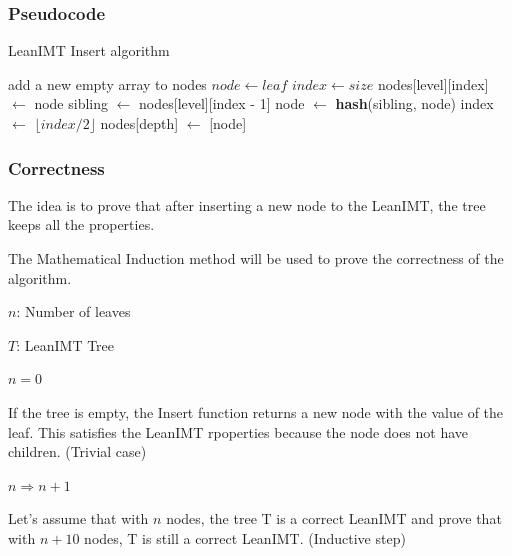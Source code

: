\documentclass{article}
\begin{document}
\subsubsection{Pseudocode}

\begin{algorithm}[H]
    \caption{LeanIMT Insert algorithm}\label{insert}
    \begin{algorithmic}[1]
         
        \State add a new empty array to nodes 
        \EndIf
        \State $node\gets leaf$
        \State $index\gets size$ 
        \State nodes[level][index] $\gets$ node
         
        \State sibling $\gets$ nodes[level][index - 1]
        \State node $\gets$ \textbf{hash}(sibling, node)
        \EndIf
        \State index $\gets$ $\lfloor index/2 \rfloor$ 
        \EndFor
        \State nodes[depth] $\gets$ [node] 
        \EndProcedure
    \end{algorithmic}
\end{algorithm}



\subsubsection{Correctness}

The idea is to prove that after inserting a new node to the LeanIMT, the tree keeps all the properties.

The Mathematical Induction method will be used to prove the correctness of the algorithm.

$n$: Number of leaves

$T$: LeanIMT Tree

$n=0$

If the tree is empty, the Insert function returns a new node with the value of the leaf. This satisfies the LeanIMT rpoperties because the node does not have children. (Trivial case)

$n \Rightarrow n+1$

Let's assume that with $n$ nodes, the tree T is a correct LeanIMT and prove that with $n+10$ nodes, T is still a correct LeanIMT. (Inductive step)
\end{document}
